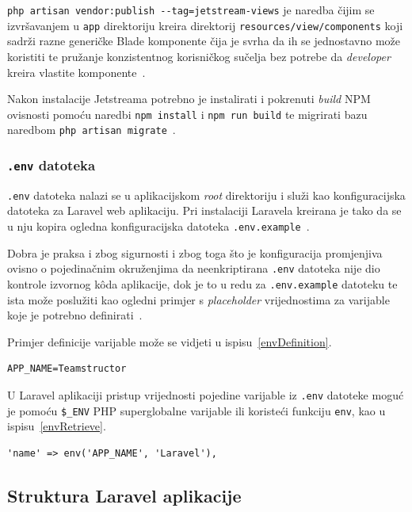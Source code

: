 \texttt{php artisan vendor:publish -{}-tag=jetstream-views} je naredba čijim se izvršavanjem u \texttt{app} direktoriju kreira direktorij \texttt{resources/view/components} koji sadrži razne generičke Blade komponente čija je svrha da ih se jednostavno može koristiti te pružanje konzistentnog korisničkog sučelja bez potrebe da \textit{developer} kreira vlastite komponente~\cite{jetstreamLivewire}.

Nakon instalacije Jetstreama potrebno je instalirati i pokrenuti \textit{build} NPM ovisnosti pomoću naredbi \texttt{npm install} i \texttt{npm run build} te migrirati bazu naredbom \texttt{php artisan migrate}~\cite{jetstreamInstallation}.

\subsubsection{\texttt{.env} datoteka}
\texttt{.env} datoteka nalazi se u aplikacijskom \textit{root} direktoriju i služi kao konfiguracijska datoteka za Laravel web aplikaciju. Pri instalaciji Laravela kreirana je tako da se u nju kopira ogledna konfiguracijska datoteka \texttt{.env.example}~\cite{configuration}. 

Dobra je praksa i zbog sigurnosti i zbog toga što je konfiguracija promjenjiva ovisno o pojedinačnim okruženjima da neenkriptirana \texttt{.env} datoteka nije dio kontrole izvornog k\^oda aplikacije, dok je to u redu za \texttt{.env.example} datoteku te ista može poslužiti kao ogledni primjer s \textit{placeholder} vrijednostima za varijable koje je potrebno definirati~\cite{configuration}.

Primjer definicije varijable može se vidjeti u ispisu~\ref{envDefinition}.

\begin{lstlisting}[caption={Definicija varijable u \texttt{.env} datoteci}, label=envDefinition]
APP_NAME=Teamstructor
\end{lstlisting}

U Laravel aplikaciji pristup vrijednosti pojedine varijable iz \texttt{.env} datoteke moguć je pomoću \texttt{\$\_ENV} PHP superglobalne varijable ili koristeći funkciju \texttt{env}, kao u ispisu~\ref{envRetrieve}.

\begin{lstlisting}[caption={Pristup vrijednosti \textit{environment} varijable u Laravelu}, label=envRetrieve]
'name' => env('APP_NAME', 'Laravel'),
\end{lstlisting}

\subsection{Struktura Laravel aplikacije}

